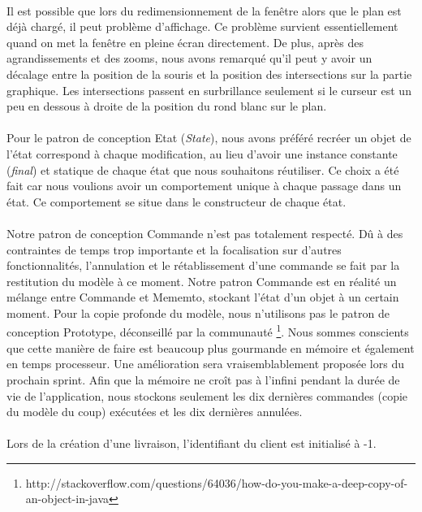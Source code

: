 \documentclass[10pt,a4paper]{book}
\begin{document}
\paragraph{}
Il est possible que lors du redimensionnement de la fenêtre alors que le plan est déjà chargé, il peut problème d'affichage. Ce problème survient essentiellement quand on met la fenêtre en pleine écran directement. De plus, après des agrandissements et des zooms, nous avons remarqué qu'il peut y avoir un décalage entre la position de la souris et la position des intersections sur la partie graphique. Les intersections passent en surbrillance seulement si le curseur est un peu en dessous à droite de la position du rond blanc sur le plan.
\paragraph{}
Pour le patron de conception Etat (\textit{State}), nous avons préféré recréer un objet de l'état correspond à chaque modification, au lieu d'avoir une instance constante (\textit{final}) et statique de chaque état que nous souhaitons réutiliser. Ce choix a été fait car nous voulions avoir un comportement unique à chaque passage dans un état. Ce comportement se situe dans le constructeur de chaque état.
\paragraph{}
Notre patron de conception Commande n'est pas totalement respecté. Dû à des contraintes de temps trop importante et la focalisation sur d'autres fonctionnalités, l'annulation et le rétablissement d'une commande se fait par la restitution du modèle à ce moment. Notre patron Commande est en réalité un mélange entre Commande et Mememto, stockant l'état d'un objet à un certain moment. Pour la copie profonde du modèle, nous n'utilisons pas le patron de conception Prototype, déconseillé par la communauté \footnote{http://stackoverflow.com/questions/64036/how-do-you-make-a-deep-copy-of-an-object-in-java}. Nous sommes conscients que cette manière de faire est beaucoup plus gourmande en mémoire et également en temps processeur. Une amélioration sera vraisemblablement proposée lors du prochain sprint. Afin que la mémoire ne croît pas à l'infini pendant la durée de vie de l'application, nous stockons seulement les dix dernières commandes (copie du modèle du coup) exécutées et les dix dernières annulées.
\paragraph{}
Lors de la création d'une livraison, l'identifiant du client est initialisé à -1.
\end{document}
